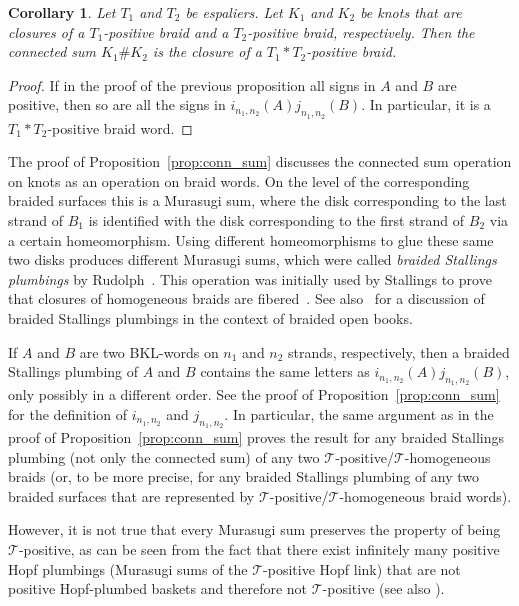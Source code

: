 \documentclass{amsart}
\theoremstyle{definition}
\theoremstyle{remark}
\theoremstyle{plain}
\newtheorem{corollary}[definition]{Corollary}
\begin{document}
\begin{corollary}
Let $T_1$ and $T_2$ be espaliers.
Let $K_1$ and $K_2$ be knots that are closures of a $T_1$-positive braid and a $T_2$-positive braid, respectively. Then the connected sum $K_1\# K_2$ is the closure of a $T_1\ast T_2$-positive braid.
\end{corollary}

\begin{proof}
If in the proof of the previous proposition all signs in $A$ and $B$ are positive, then so are all the signs in $i_{n_1,n_2}(A)j_{n_1,n_2}(B)$. In particular, it is a $T_1*T_2$-positive braid word.
\end{proof}

The proof of Proposition~\ref{prop:conn_sum} discusses the connected sum operation on knots as an operation on braid words. On the level of the corresponding braided surfaces this is a Murasugi sum, where the disk corresponding to the last strand of $B_1$ is identified with the disk corresponding to the first strand of $B_2$ via a certain homeomorphism. Using different homeomorphisms to glue these same two disks produces different Murasugi sums, which were called \textit{braided Stallings plumbings} by Rudolph~\cite{Rudolph_V}. This operation was initially used by Stallings to prove that closures of homogeneous braids are fibered~\cite{stallings_1978}. See also~\cite{bode_hsueh} for a discussion of braided Stallings plumbings in the context of braided open books. 

If $A$ and $B$ are two BKL-words on $n_1$ and $n_2$ strands, respectively, then a braided Stallings plumbing of $A$ and $B$ contains the same letters as $i_{n_1,n_2}(A)j_{n_1,n_2}(B)$, only possibly in a different order. See the proof of Proposition~\ref{prop:conn_sum} for the definition of $i_{n_1,n_2}$ and $j_{n_1,n_2}$. In particular, the same argument as in the proof of Proposition~\ref{prop:conn_sum} proves the result for any braided Stallings plumbing (not only the connected sum) of any two $\mathcal{T}$-positive/$\mathcal{T}$-homogeneous braids (or, to be more precise, for any braided Stallings plumbing of any two braided surfaces that are represented by $\mathcal{T}$-positive/$\mathcal{T}$-homogeneous braid words).

However, it is not true that every Murasugi sum preserves the property of being $\mathcal{T}$-positive, as can be seen from the fact that there exist infinitely many positive Hopf plumbings (Murasugi sums of the $\mathcal{T}$-positive Hopf link) that are not positive Hopf-plumbed baskets \cite{misev} and therefore not $\mathcal{T}$-positive (see also ).
\end{document}
